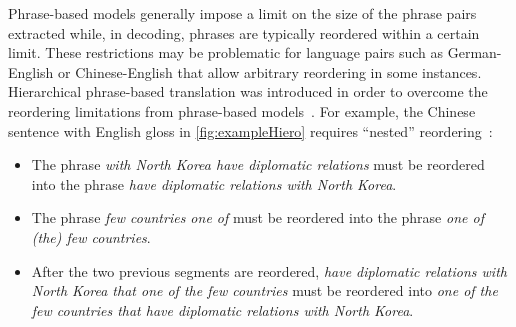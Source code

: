 Phrase-based models generally impose a limit on the size
of the phrase pairs extracted while, in decoding, phrases
are typically reordered within a certain limit.
These restrictions may be problematic for language pairs
such as German-English or Chinese-English that allow
arbitrary reordering in some instances.
Hierarchical phrase-based translation was introduced
in order to overcome the reordering limitations from
phrase-based models~\citep{chiang:2005:ACL,chiang:2007:CL}.
For example, the Chinese sentence with English gloss
in \autoref{fig:exampleHiero} requires ``nested'' reordering~\citep{chiang:2007:CL}:
%
\begin{itemize}
  \item The phrase \emph{with North Korea have diplomatic relations} must be reordered into
    the phrase \emph{have diplomatic relations with North Korea}.
  \item The phrase \emph{few countries one of} must be reordered into the phrase \emph{one of (the) few countries}.
  \item After the two previous segments are reordered, \emph{have diplomatic relations with North Korea that one of the few countries} must be reordered into \emph{one of the few countries that have diplomatic relations with North Korea}.
\end{itemize}
%
